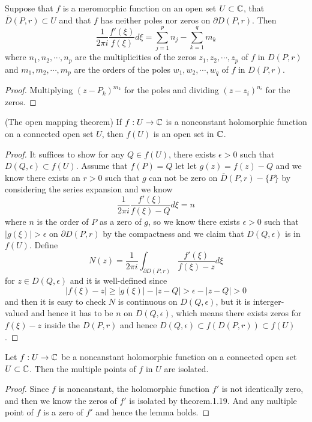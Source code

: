 \begin{theorem}
    Suppose that $f$ is a meromorphic function on an open set $U\subset \mathbb{C}$, that $\overline{D}(P,r) \subset U$
    and that $f$ has neither poles nor zeros on $\partial D(P,r)$. Then
    \[\dfrac{1}{2\pi i}\dfrac{f'(\xi)}{f(\xi)} d\xi = \sum\limits_{j=1}^p n_j - \sum\limits_{k=1}^q m_k\]
    where $n_1,n_2,\cdots,n_p$ are the multiplicities of the zeros $z_1,z_2,\cdots,z_p$ of $f$ in $D(P,r)$ and $m_1,m_2,\cdots,m_p$ are the orders of the poles $w_1,w_2,\cdots,w_q$ of $f$ in $D(P,r)$.
\end{theorem}
\begin{proof}
    Multiplying $(z-P_k)^{m_k}$ for the poles and dividing $(z-z_i)^{n_i}$ for the zeros. 
\end{proof}

\begin{theorem}
    (The open mapping theorem) If $f:U\to\mathbb{C}$ is a nonconstant holomorphic function on a connected open set $U$, then $f(U)$ is an open set in $\mathbb{C}$.
\end{theorem}
\begin{proof}
    It suffices to show for any $Q\in f(U)$, there exists $\epsilon > 0$ such that $D(Q,\epsilon) \subset f(U)$. Assume that $f(P) = Q$ let let $g(z) = f(z)-Q$ and we know there exists an $r>0$ such that $g$ can not be zero on $\overline{D}(P,r)-\{P\}$ by considering the series expansion and we know
    \[
    \dfrac{1}{2\pi i} \dfrac{f'(\xi)}{f(\xi)-Q}d\xi = n
    \]
    where $n$ is the order of $P$ as a zero of $g$, so we know there exists $\epsilon > 0$ such that $|g(\xi)| > \epsilon$ on $\partial D(P,r)$ by the compactness and we claim that $D(Q,\epsilon)$ is in $f(U)$. Define
    \[N(z) = \dfrac{1}{2\pi i} \int_{\partial D(P,r)} \dfrac{f'(\xi)}{f(\xi) - z}d\xi\]
    for $z\in D(Q,\epsilon)$ and it is well-defined since
    \[|f(\xi)-z| \geq |g(\xi)| - |z-Q| > \epsilon - |z-Q| > 0\]
    and then it is easy to check $N$ is continuous on $D(Q,\epsilon)$, but it is interger-valued and hence it has to be $n$ on $D(Q,\epsilon)$, which means there exists zeros for $f(\xi) - z$ inside the $D(P,r)$ and hence $D(Q,\epsilon) \subset f(D(P,r)) \subset f(U)$.
\end{proof}

\begin{lemma}
    Let $f:U\to\mathbb{C}$ be a noncanstant holomorphic function on a connected open set $U\subset\mathbb{C}$. Then the multiple points of $f$ in $U$ are isolated.
\end{lemma}
\begin{proof}
    Since $f$ is noncanstant, the holomorphic function $f'$ is not identically zero, and then we know the zeros of $f'$ is isolated by theorem.1.19. And any multiple point of $f$ is a zero of $f'$ and hence the lemma holds.
\end{proof}

